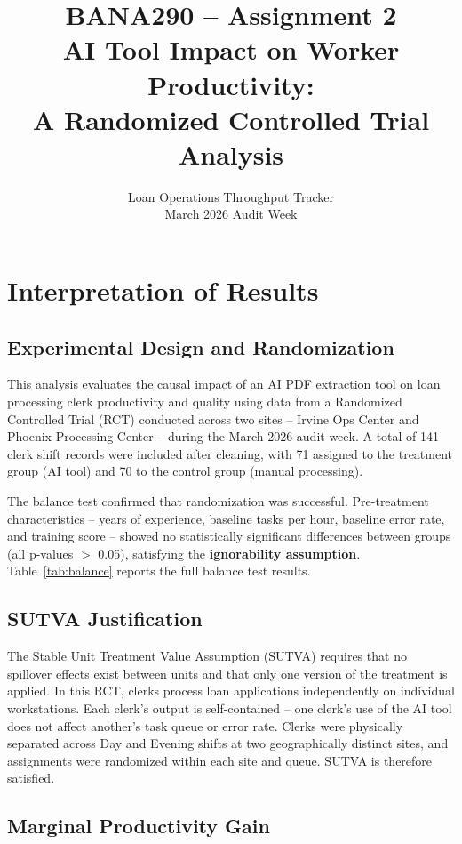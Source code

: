 \documentclass[12pt]{article}
\title{\textbf{BANA290 -- Assignment 2} \\
       \large AI Tool Impact on Worker Productivity: \\
       A Randomized Controlled Trial Analysis}
\author{Loan Operations Throughput Tracker \\
        March 2026 Audit Week}
\date{}
\begin{document}
\maketitle

\section*{Interpretation of Results}

\subsection*{Experimental Design and Randomization}

This analysis evaluates the causal impact of an AI PDF extraction
tool on loan processing clerk productivity and quality using data
from a Randomized Controlled Trial (RCT) conducted across two
sites -- Irvine Ops Center and Phoenix Processing Center -- during
the March 2026 audit week. A total of 141 clerk shift records were
included after cleaning, with 71 assigned to the treatment group
(AI tool) and 70 to the control group (manual processing).

The balance test confirmed that randomization was successful.
Pre-treatment characteristics -- years of experience, baseline
tasks per hour, baseline error rate, and training score -- showed
no statistically significant differences between groups (all
p-values $>$ 0.05), satisfying the \textbf{ignorability assumption}.
Table~\ref{tab:balance} reports the full balance test results.

\subsection*{SUTVA Justification}

The Stable Unit Treatment Value Assumption (SUTVA) requires that
no spillover effects exist between units and that only one version
of the treatment is applied. In this RCT, clerks process loan
applications independently on individual workstations. Each
clerk's output is self-contained -- one clerk's use of the AI
tool does not affect another's task queue or error rate. Clerks
were physically separated across Day and Evening shifts at two
geographically distinct sites, and assignments were randomized
within each site and queue. SUTVA is therefore satisfied.

\subsection*{Marginal Productivity Gain}
\end{document}
